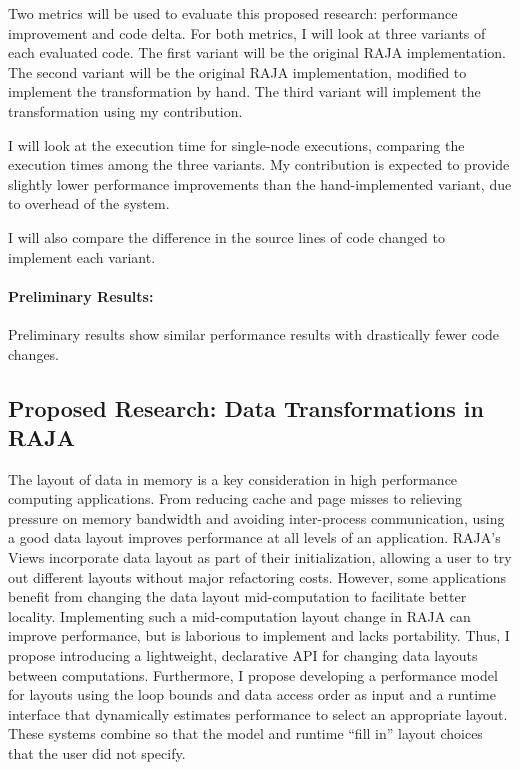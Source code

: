 \documentclass{article}
\begin{document}
Two metrics will be used to evaluate this proposed research: performance improvement and code delta. 
For both metrics, I will look at three variants of each evaluated code.
The first variant will be the original RAJA implementation. 
The second variant will be the original RAJA implementation, modified to implement the transformation by hand.
The third variant will implement the transformation using my contribution.

I will look at the execution time for single-node executions, comparing the execution times among the three variants. My contribution is expected to provide slightly lower performance improvements than the hand-implemented variant, due to overhead of the system.

I will also compare the difference in the source lines of code changed to implement each variant.
\paragraph{Preliminary Results:}
Preliminary results show similar performance results with drastically fewer code changes.


\subsection{Proposed Research: Data Transformations in RAJA}

The layout of data in memory is a key consideration in high performance computing applications.
From reducing cache and page misses to relieving pressure on memory bandwidth and avoiding inter-process communication, using a good data layout improves performance at all levels of an application.
RAJA's Views incorporate data layout as part of their initialization, allowing a user to try out different layouts without major refactoring costs.
However, some applications benefit from changing the data layout mid-computation to facilitate better locality.
Implementing such a mid-computation layout change in RAJA can improve performance, but is laborious to implement and lacks portability.
Thus, I propose introducing a lightweight, declarative API for changing data layouts between computations.
Furthermore, I propose developing a performance model for layouts using the loop bounds and data access order as input and a runtime interface that dynamically estimates performance to select an appropriate layout. 
These systems combine so that the model and runtime \enquote{fill in} layout choices
that the user did not specify.
\end{document}
